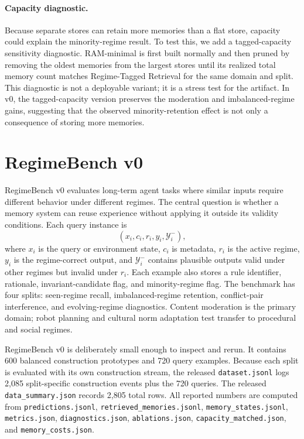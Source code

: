 \documentclass{article} %
\begin{document}
\paragraph{Capacity diagnostic.}
Because separate stores can retain more memories than a flat store, capacity could explain the minority-regime result.
To test this, we add a tagged-capacity sensitivity diagnostic.
RAM-minimal is first built normally and then pruned by removing the oldest memories from the largest stores until its realized total memory count matches Regime-Tagged Retrieval for the same domain and split.
This diagnostic is not a deployable variant; it is a stress test for the artifact.
In v0, the tagged-capacity version preserves the moderation and imbalanced-regime gains, suggesting that the observed minority-retention effect is not only a consequence of storing more memories.

\section{RegimeBench v0}
\label{sec:regimebench_v0}

RegimeBench v0 evaluates long-term agent tasks where similar inputs require different behavior under different regimes.
The central question is whether a memory system can reuse experience without applying it outside its validity conditions.
Each query instance is
\begin{equation}
    (x_i, c_i, r_i, y_i, \mathcal{Y}_i^{-}),
\end{equation}
where $x_i$ is the query or environment state, $c_i$ is metadata, $r_i$ is the active regime, $y_i$ is the regime-correct output, and $\mathcal{Y}_i^{-}$ contains plausible outputs valid under other regimes but invalid under $r_i$.
Each example also stores a rule identifier, rationale, invariant-candidate flag, and minority-regime flag.
The benchmark has four splits: seen-regime recall, imbalanced-regime retention, conflict-pair interference, and evolving-regime diagnostics.
Content moderation is the primary domain; robot planning and cultural norm adaptation test transfer to procedural and social regimes.

RegimeBench v0 is deliberately small enough to inspect and rerun.
It contains 600 balanced construction prototypes and 720 query examples.
Because each split is evaluated with its own construction stream, the released \texttt{dataset.jsonl} logs 2,085 split-specific construction events plus the 720 queries.
The released \texttt{data\_summary.json} records 2,805 total rows.
All reported numbers are computed from \texttt{predictions.jsonl}, \texttt{retrieved\_memories.jsonl}, \texttt{memory\_states.jsonl}, \texttt{metrics.json}, \texttt{diagnostics.json}, \texttt{ablations.json}, \texttt{capacity\_matched.json}, and \texttt{memory\_costs.json}.
\end{document}
